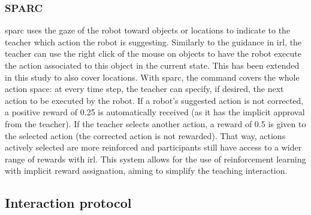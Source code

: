\subsubsection{SPARC}

\gls{sparc} uses the gaze of the robot toward objects or locations to indicate to the teacher which action the robot is suggesting. Similarly to the guidance in \gls{irl}, the teacher can use the right click of the mouse on objects to have the robot execute the action associated to this object in the current state. This has been extended in this study to also cover locations. With \gls{sparc}, the command covers the whole action space: at every time step, the teacher can specify, if desired, the next action to be executed by the robot. If a robot's suggested action is not corrected, a positive reward of 0.25 is automatically received (as it has the implicit approval from the teacher). If the teacher selects another action, a reward of 0.5 is given to the selected action (the corrected action is not rewarded). That way, actions actively selected are more reinforced and participants still have access to a wider range of rewards with \gls{irl}. This system allows for the use of reinforcement learning with implicit reward assignation, aiming to simplify the teaching interaction.

\subsection{Interaction protocol}

